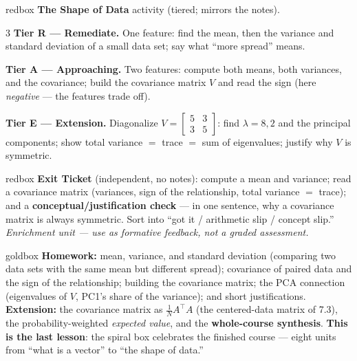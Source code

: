 \documentclass[10pt]{article}
\begin{document}
\begin{skillbox}{redbox}
\textbf{The Shape of Data} activity (tiered; mirrors the notes).
\begin{multicols}{3}
\textbf{Tier R --- Remediate.} One feature: find the mean, then the variance and standard deviation of a small
data set; say what ``more spread'' means.

\columnbreak
\textbf{Tier A --- Approaching.} Two features: compute both means, both variances, and the covariance; build the
covariance matrix $V$ and read the sign (here \emph{negative} --- the features trade off).

\columnbreak
\textbf{Tier E --- Extension.} Diagonalize $V=\left[\begin{smallmatrix}5&3\\3&5\end{smallmatrix}\right]$: find
$\lambda=8,2$ and the principal components; show total variance $=$ trace $=$ sum of eigenvalues; justify why
$V$ is symmetric.
\end{multicols}
\end{skillbox}

\begin{skillbox}{redbox}
\textbf{Exit Ticket} (independent, no notes): compute a mean and variance; read a covariance matrix (variances,
sign of the relationship, total variance $=$ trace); and a \textbf{conceptual/justification check} --- in one
sentence, why a covariance matrix is always symmetric. Sort into ``got it / arithmetic slip / concept slip.''
\emph{Enrichment unit --- use as formative feedback, not a graded assessment.}
\end{skillbox}

\begin{skillbox}{goldbox}
\textbf{Homework:} mean, variance, and standard deviation (comparing two data sets with the same mean but
different spread); covariance of paired data and the sign of the relationship; building the covariance matrix;
the PCA connection (eigenvalues of $V$, PC1's share of the variance); and short justifications. \textbf{Extension:}
the covariance matrix as $\frac1N A^{\top}\!A$ (the centered-data matrix of 7.3), the probability-weighted
\emph{expected value}, and the \textbf{whole-course synthesis}. \textbf{This is the last lesson}: the
spiral box celebrates the finished course --- eight units from ``what is a vector'' to ``the shape of data.''
\end{skillbox}
\end{document}
